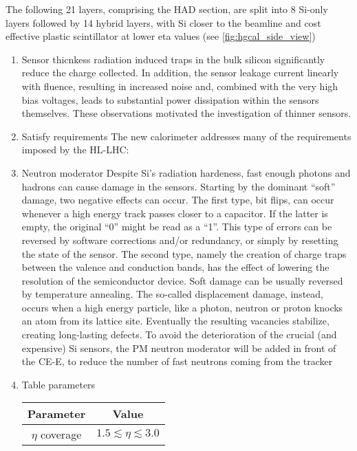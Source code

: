 \documentclass[11pt]{article}
\begin{document}
The following 21 layers, comprising the \ac{HAD} section, are split into 8 \ac{Si}-only layers followed by 14 hybrid layers, with \ac{Si} closer to the beamline and cost effective plastic scintillator at lower \ac{eta} values (see \cref{fig:hgcal_side_view})
\begin{enumerate}
\item Sensor thicnkess
\label{sec:org9f6fe5d}
radiation induced traps in the bulk silicon significantly reduce the charge collected.
In addition, the sensor leakage current linearly with fluence, resulting in increased noise and, combined with the very high
bias voltages, leads to substantial power dissipation within the sensors themselves.
These observations motivated the investigation of thinner sensors. \cite{hgcalTDR}
\item Satisfy requirements
\label{sec:org08d78ad}
The new calorimeter addresses many of the requirements imposed by the \ac{HL-LHC}:
\item Neutron moderator
\label{sec:org12299c4}
Despite \ac{Si}'s radiation hardeness, fast enough photons and hadrons can cause damage in the sensors.
Starting by the dominant ``soft'' damage, two negative effects can occur.
The first type, bit flips, can occur whenever a high energy track passes closer to a capacitor.
If the latter is empty, the original ``0'' might be read as a ``1''.
This type of errors can be reversed by software corrections and/or redundancy, or simply by resetting the state of the sensor.
The second type, namely the creation of charge traps between the valence and conduction bands, has the effect of lowering the resolution of the semiconductor device.
Soft damage can be usually reversed by temperature annealing.
The so-called displacement damage, instead, occurs when a high energy particle, like a photon, neutron or proton knocks an atom from its lattice site. Eventually the resulting vacancies stabilize, creating long-lasting defects.
To avoid the deterioration of the crucial (and expensive) \ac{Si} sensors, the \ac{PM} neutron moderator will be added in front of the \ac{CE-E}, to reduce the number of fast neutrons coming from the tracker \cite{calorimetry_fabjan,radiation_damage_silicon2,radiation_damage_silicon}
\item Table parameters
\label{sec:org0867fca}
\begin{table}[!h]
\centering
\begin{tabular}{c|c}
Parameter & Value\\
\hline
\(\eta\) coverage & \(1.5 \lesssim \eta \lesssim 3.0\)\\

\end{tabular}
\end{table}
\end{enumerate}
\end{document}
